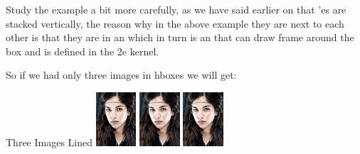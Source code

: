 \begin{texexample}{}{}
\end{texexample}

Study the example a bit more carefully, as we have said earlier on that 'es are stacked vertically, the reason why in the above example they are next to each other is that they are in an
 which in turn is an   that can draw  frame around the box and is defined in the
\latex2e kernel.

So if we had only three images in hboxes we will get:

\begin{texexample}{Three Images Lined}{}
\leavevmode
\parindent30pt
\hbox{\includegraphics[width=1.5cm]{./images/amato.jpg}}%
\hbox{\includegraphics[width=1.5cm]{./images/amato.jpg}}%
\hbox{\includegraphics[width=1.5cm]{./images/amato.jpg}}%
\end{texexample}

